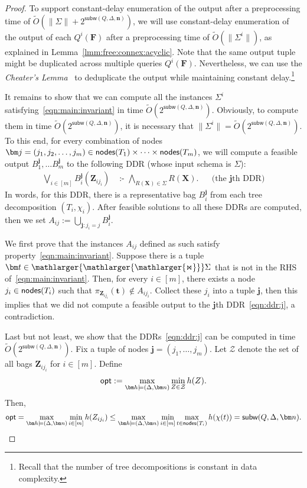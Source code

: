 \documentclass{theoretics}
\newcommand{\norm}[1]{\|#1\|}
\newcommand{\opt}{\text{\sf opt}}
\newcommand{\calZ}{\mathcal Z}
\newcommand{\cd}{\text{ :- }}
\newcommand{\bigjoin}{\mathlarger{\mathlarger{\mathlarger{\Join}}}}
\newcommand{\nodes}{\text{\sf nodes}}
\newcommand{\subm}{\textsf{subw}}
\begin{document}
\begin{proof}
To support constant-delay enumeration of the output after a preprocessing time of $\tilde O(\norm{\Sigma} + 2^{\subm(Q, \Delta, \bm n)})$,
we will use constant-delay enumeration of the output of each $Q^i(\bm F)$
after a preprocessing time of $\tilde O(\norm{\Sigma^i})$, as explained in Lemma~\ref{lmm:free:connex:acyclic}.
Note that the same output tuple might be duplicated across multiple queries $Q^i(\bm F)$.
Nevertheless, we can use the {\em Cheater's Lemma}~\cite{10.1145/3450263} to deduplicate the output while maintaining constant delay.\footnote{Recall that the number of tree decompositions is constant in data complexity.}

  It remains to show that we can compute all the instances $\Sigma^i$
  satisfying~\eqref{eqn:main:invariant} in time \linebreak $\tilde O(2^{\subm(Q, \Delta, \bm n)})$.
  Obviously, to compute them in time $\tilde O(2^{\subm(Q, \Delta, \bm n)})$, it is
  necessary that $\norm{\Sigma^i} = \tilde O(2^{\subm(Q, \Delta, \bm n)})$. To this
  end, for every combination of nodes $\bm j = (j_1, j_2, \dots, j_m) \in \nodes(T_1) \times
  \cdots \times \nodes(T_m)$, we will compute a feasible output $B^{\bm j}_1, \dots B^{\bm
  j}_m$ to the following DDR (whose input schema is $\Sigma$):
  \begin{align}
     \bigvee_{i \in [m]} B^{\bm j}_i(\bm Z_{ij_i}) & \cd \bigwedge_{R(\bm X) \in \Sigma}R(\bm X).
     && \text{(the $\bm j$th DDR)}
     \label{eqn:ddr:j}
  \end{align}
  In words, for this DDR, there is a representative bag $B_i^{\bm j}$ from each tree decomposition
  $(T_i,\chi_i)$.
  After feasible solutions to all these DDRs are computed, then we set
  $A_{ij} := \bigcup_{\bm j : j_i = j} B_i^{\bm j}.$

  We first prove that the instances $A_{ij}$ defined as such
  satisfy property~\eqref{eqn:main:invariant}. Suppose there is a tuple $\bm t \in
  \bigjoin \Sigma$ that is not in the RHS of~\eqref{eqn:main:invariant}. Then, for
  every $i \in [m]$, there exists a node $j_i \in \nodes(T_i)$ such that $\pi_{\bm
  Z_{ij_i}}(\bm t) \not\in A_{ij_i}$. Collect these $j_i$ into a tuple $\bm j$, then this
  implies that we did not compute a feasible output to the $\bm j$th
  DDR~\eqref{eqn:ddr:j}, a contradiction.

  Last but not least, we show that the DDRs~\eqref{eqn:ddr:j} can be computed in time
  $\tilde O(2^{\subm(Q, \Delta, \bm n)})$.  Fix a tuple of nodes $\bm j = (j_1, \dots, j_m)$.
  Let $\calZ$ denote the set of all bags $\bm Z_{ij_i}$ for $i \in [m]$.
  Define
  \[ \opt := \max_{\bm h \models (\Delta, \bm n)} \min_{Z \in \calZ} h(Z).  \]
  Then,
  \begin{align*}
    \opt = \max_{\bm h \models (\Delta, \bm n)} \min_{i \in [m]} h(Z_{ij_i})
         \leq \max_{\bm h \models (\Delta, \bm n)} \min_{i \in [m]} \max_{t \in \nodes(T_i)} h(\chi(t))
         = \subm(Q, \Delta, \bm n).
  \end{align*}


\end{proof}
\end{document}
